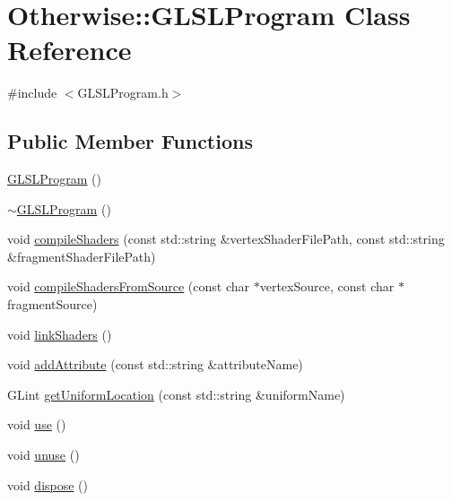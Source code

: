 \hypertarget{class_otherwise_1_1_g_l_s_l_program}{}\section{Otherwise\+:\+:G\+L\+S\+L\+Program Class Reference}
\label{class_otherwise_1_1_g_l_s_l_program}


{\ttfamily \#include $<$G\+L\+S\+L\+Program.\+h$>$}

\subsection*{Public Member Functions}
\begin{DoxyCompactItemize}
\item 
\hyperlink{class_otherwise_1_1_g_l_s_l_program_a2edbc486493a624ff3ff75951c304baa}{G\+L\+S\+L\+Program} ()
\item 
\hyperlink{class_otherwise_1_1_g_l_s_l_program_af63329a991f67a4c819c0889321078cd}{$\sim$\+G\+L\+S\+L\+Program} ()
\item 
void \hyperlink{class_otherwise_1_1_g_l_s_l_program_a4dd0b92d5d5ca700a060fcc5194e78a7}{compile\+Shaders} (const std\+::string \&vertex\+Shader\+File\+Path, const std\+::string \&fragment\+Shader\+File\+Path)
\item 
void \hyperlink{class_otherwise_1_1_g_l_s_l_program_ac6e8d01f7082e483c12d5cce44d60991}{compile\+Shaders\+From\+Source} (const char $\ast$vertex\+Source, const char $\ast$fragment\+Source)
\item 
void \hyperlink{class_otherwise_1_1_g_l_s_l_program_a49714d1e90dcb57012e389764f7fe3a1}{link\+Shaders} ()
\item 
void \hyperlink{class_otherwise_1_1_g_l_s_l_program_aee49f20d56dda1c0b109f93edc9e30be}{add\+Attribute} (const std\+::string \&attribute\+Name)
\item 
G\+Lint \hyperlink{class_otherwise_1_1_g_l_s_l_program_a15f93dc15142cf7d99d8b00e53a685c6}{get\+Uniform\+Location} (const std\+::string \&uniform\+Name)
\item 
void \hyperlink{class_otherwise_1_1_g_l_s_l_program_a573a963ed74707efb8cec3285b1acfff}{use} ()
\item 
void \hyperlink{class_otherwise_1_1_g_l_s_l_program_a4cda1d560e249dacb731d6e79db2842a}{unuse} ()
\item 
void \hyperlink{class_otherwise_1_1_g_l_s_l_program_afb779820cfe83f781699a38a1de2a23b}{dispose} ()
\end{DoxyCompactItemize}
